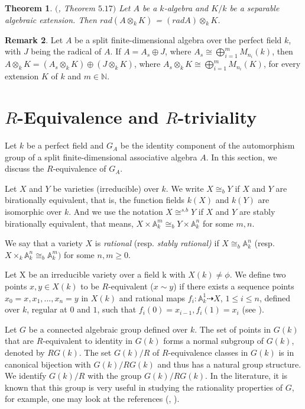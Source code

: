 \documentclass[12pt]{amsart}
\newtheorem{theorem}{Theorem}[section]
\theoremstyle{definition}
\newtheorem{remark}[theorem]{Remark}
\numberwithin{equation}{section}
\begin{document}
\vskip2mm

\begin{theorem}\label{Theorem 3.6}
$($\cite{Lam}, \emph{Theorem} $5.17)$ Let $A$ be a $k$-algebra and $K/k$ be a separable algebraic extension. Then $rad(A\otimes_{k} K)$ = $(radA)\otimes_{k} K$.
\end{theorem}

\vskip2mm

\begin{remark}\label{Remark 3.7}
   Let $A$ be a split finite-dimensional algebra over the perfect field $k$, with $J$ being the radical of $A$. If $A=A_s\oplus J$, where $A_s\cong \bigoplus_{i=1}^{m} M_{n_i}(k)$, then $A\otimes_k K=(A_s\otimes_k K)\oplus (J\otimes_k K)$, where $A_s\otimes_k K\cong \bigoplus_{i=1}^{m} M_{n_i}(K)$, for every extension $K$ of $k$ and $m\in \mathbb{N}$.
\end{remark}

\vskip2mm
\section{$R$-Equivalence and $R$-triviality}\label{R-equivalence}
\vskip2mm
\noindent
Let $k$ be a perfect field and $G_A$ be the identity component of the automorphism group of a split finite-dimensional associative algebra $A$. In this section, we discuss the $R$-equivalence of $G_A$.

\vskip2mm
\noindent
Let $X$ and $Y$ be varieties (irreducible) over $k$. We write $X\cong_b Y$ if $X$ and $Y$ are birationally equivalent, that is, the function fields $k(X)$ and $k(Y)$ are isomorphic over $k$. And we use the notation $X \cong^{s.b} Y$ if $X$ and $Y$ are stably birationally equivalent, that means, $X\times \mathbb{A}_k^m\cong_b Y\times \mathbb{A}_k^n$ for some $m,n$.

\vskip2mm
\noindent
We say that a variety $X$ is \emph{rational} (resp. \emph{stably rational)} if $X\cong_b\mathbb{A}_k^n$ (resp. $X\times_k \mathbb{A}_k^n\cong_b \mathbb{A}_k^{m})$  for some $n,m\geq 0$.
  
\vskip2mm
\noindent
Let X be an irreducible variety over a field k with $X(k)\neq\phi$. We define two points $x, y \in X(k)$ to be $R$-equivalent ($x \sim y$) if there exists a sequence points $x_0= x, x_1,...,x_n=y$ in $X(k)$ and rational
maps $f_i:\mathbb{A}^{1}_{k}\dashrightarrow X$, $1\leq i\leq n$, defined over $k$, regular at $0$ and $1$, such
that $f_{i}(0)=x_{i-1},f_{i}(1)=x_{i}$ (see \cite{Manin}).

\vskip2mm
\noindent
Let $G$ be a connected algebraic group defined over $k$. The set of points in $G(k)$ that are $R$-equivalent to identity in $G(k)$ forms a normal subgroup of $G(k)$, denoted by $RG(k)$. The set $G(k)/R$ of $R$-equivalence classes in $G(k)$ is in canonical bijection with $G(k)/RG(k)$ and thus has a natural group structure. We identify $G(k)/R$ with the group $G(k)/RG(k)$. In the literature, it is known that this group is very useful in studying the rationality properties of $G$, for example, one may look at the references (\cite{Voskrenskii}, \cite{Gille1}).
\end{document}
